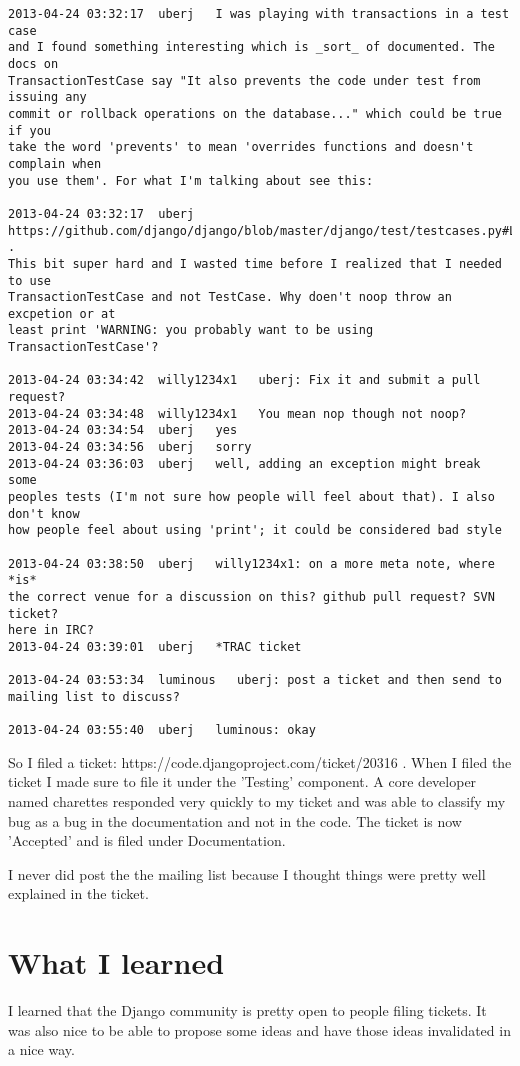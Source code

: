 \documentclass[12pt]{article}
\begin{document}
\begin{lstlisting}
2013-04-24 03:32:17  uberj   I was playing with transactions in a test case
and I found something interesting which is _sort_ of documented. The docs on
TransactionTestCase say "It also prevents the code under test from issuing any
commit or rollback operations on the database..." which could be true if you
take the word 'prevents' to mean 'overrides functions and doesn't complain when
you use them'. For what I'm talking about see this:

2013-04-24 03:32:17  uberj
https://github.com/django/django/blob/master/django/test/testcases.py#L75 .
This bit super hard and I wasted time before I realized that I needed to use
TransactionTestCase and not TestCase. Why doen't noop throw an excpetion or at
least print 'WARNING: you probably want to be using TransactionTestCase'?

2013-04-24 03:34:42  willy1234x1   uberj: Fix it and submit a pull request?
2013-04-24 03:34:48  willy1234x1   You mean nop though not noop?
2013-04-24 03:34:54  uberj   yes
2013-04-24 03:34:56  uberj   sorry
2013-04-24 03:36:03  uberj   well, adding an exception might break some
peoples tests (I'm not sure how people will feel about that). I also don't know
how people feel about using 'print'; it could be considered bad style

2013-04-24 03:38:50  uberj   willy1234x1: on a more meta note, where *is*
the correct venue for a discussion on this? github pull request? SVN ticket?
here in IRC?
2013-04-24 03:39:01  uberj   *TRAC ticket

2013-04-24 03:53:34  luminous   uberj: post a ticket and then send to
mailing list to discuss?

2013-04-24 03:55:40  uberj   luminous: okay
\end{lstlisting}

So I filed a ticket: https://code.djangoproject.com/ticket/20316 . When I
filed the ticket I made sure to file it under the 'Testing' component. A core
developer named charettes responded very quickly to my ticket and was able to
classify my bug as a bug in the documentation and not in the code. The ticket
is now 'Accepted' and is filed under Documentation.

I never did post the the mailing list because I thought things were pretty well
explained in the ticket.

\section{What I learned}
I learned that the Django community is pretty open to people filing tickets. It
was also nice to be able to propose some ideas and have those ideas invalidated
in a nice way.
\end{document}
